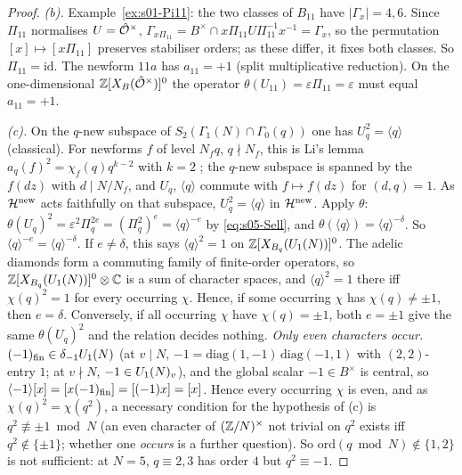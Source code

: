 \begin{proof}
\emph{(b).} Example~\ref{ex:s01-Pi11}: the two classes of $B_{11}$ have $|\Gamma_x|=4,6$. Since $\Pi_{11}$ normalises
$U=\hat{\mathcal{O}}^\times$, $\Gamma_{x\Pi_{11}}=B^\times\cap x\Pi_{11}U\Pi_{11}^{-1}x^{-1}=\Gamma_x$, so the permutation $[x]\mapsto[x\Pi_{11}]$ preserves stabiliser
orders; as these differ, it fixes both classes. So $\Pi_{11}=\mathrm{id}$. The newform $11a$ has $a_{11}=+1$ (split multiplicative reduction). On the one-dimensional
$\mathbb{Z}[X_B(\hat{\mathcal{O}}^\times)]^0$ the operator $\theta(U_{11})=\varepsilon\Pi_{11}=\varepsilon$ must equal $a_{11}=+1$.

\emph{(c).} On the $q$-new subspace of $S_2(\Gamma_1(N)\cap\Gamma_0(q))$ one has $U_q^2=\langle q\rangle$ (classical). For newforms $f$
of level $N_fq$, $q\nmid N_f$, this is Li's lemma $a_q(f)^2=\chi_f(q)q^{k-2}$ with $k=2$
; the $q$-new subspace is spanned by the
$f(dz)$ with $d\mid N/N_f$, and $U_q$, $\langle q\rangle$ commute with $f\mapsto f(dz)$ for $(d,q)=1$. As $\mathcal{H}^{\rm new}$ acts faithfully
on that subspace, $U_q^2=\langle q\rangle$ in $\mathcal{H}^{\rm new}$. Apply $\theta$: $\theta(U_q)^2=\varepsilon^2\Pi_q^{2e}=(\Pi_q^2)^e=\langle q\rangle^{-e}$ by
\eqref{eq:s05-Sell}, and $\theta(\langle q\rangle)=\langle q\rangle^{-\delta}$. So $\langle q\rangle^{-e}=\langle q\rangle^{-\delta}$. If $e\ne\delta$,
this says $\langle q\rangle^2=1$ on $\mathbb{Z}[X_{B_q}(U_1(N))]^0$. The adelic diamonds form a commuting family of finite-order operators, so
$\mathbb{Z}[X_{B_q}(U_1(N))]^0\otimes\mathbb{C}$ is a sum of character spaces, and $\langle q\rangle^2=1$ there iff $\chi(q)^2=1$ for every occurring
$\chi$. Hence, if some occurring $\chi$ has $\chi(q)\ne\pm1$, then $e=\delta$. Conversely, if all occurring $\chi$ have $\chi(q)=\pm1$,
both $e=\pm1$ give the same $\theta(U_q)^2$ and the relation decides nothing.
\emph{Only even characters occur.} $(-1)_{\rm fin}\in\delta_{-1}U_1(N)$ (at $v\mid N$, $-1=\mathrm{diag}(1,-1)\,\mathrm{diag}(-1,1)$ with $(2,2)$-entry
$1$; at $v\nmid N$, $-1\in U_1(N)_v$), and the global scalar $-1\in B^\times$ is central, so $\langle-1\rangle[x]=[x(-1)_{\rm fin}]=[(-1)x]=[x]$. Hence every
occurring $\chi$ is even, and as $\chi(q)^2=\chi(q^2)$, a necessary condition for the hypothesis of (c) is $q^2\not\equiv\pm1\bmod N$ (an even
character of $(\mathbb{Z}/N)^\times$ not trivial on $q^2$ exists iff $q^2\notin\{\pm1\}$; whether one \emph{occurs} is a further question). So
$\mathrm{ord}(q\bmod N)\notin\{1,2\}$ is not sufficient: at $N=5$, $q\equiv2,3$ has order $4$ but $q^2\equiv-1$.


\end{proof}
